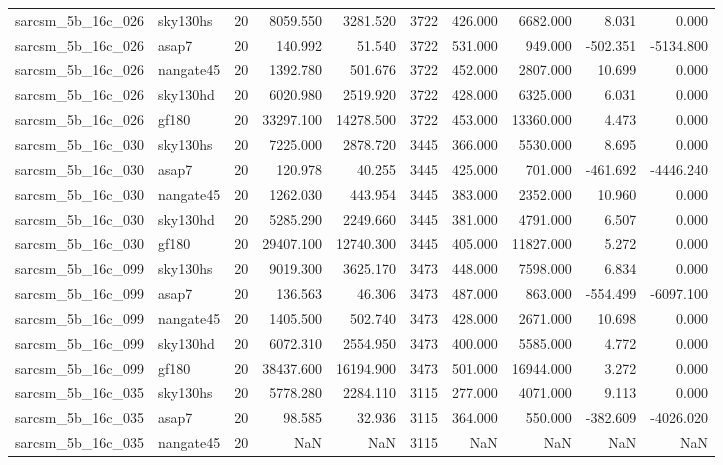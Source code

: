 \begin{longtable}{llrrrrrrrr}
sarcsm\_5b\_16c\_026 & sky130hs & 20 & 8059.550 & 3281.520 & 3722 & 426.000 & 6682.000 & 8.031 & 0.000 \\
sarcsm\_5b\_16c\_026 & asap7 & 20 & 140.992 & 51.540 & 3722 & 531.000 & 949.000 & -502.351 & -5134.800 \\
sarcsm\_5b\_16c\_026 & nangate45 & 20 & 1392.780 & 501.676 & 3722 & 452.000 & 2807.000 & 10.699 & 0.000 \\
sarcsm\_5b\_16c\_026 & sky130hd & 20 & 6020.980 & 2519.920 & 3722 & 428.000 & 6325.000 & 6.031 & 0.000 \\
sarcsm\_5b\_16c\_026 & gf180 & 20 & 33297.100 & 14278.500 & 3722 & 453.000 & 13360.000 & 4.473 & 0.000 \\
sarcsm\_5b\_16c\_030 & sky130hs & 20 & 7225.000 & 2878.720 & 3445 & 366.000 & 5530.000 & 8.695 & 0.000 \\
sarcsm\_5b\_16c\_030 & asap7 & 20 & 120.978 & 40.255 & 3445 & 425.000 & 701.000 & -461.692 & -4446.240 \\
sarcsm\_5b\_16c\_030 & nangate45 & 20 & 1262.030 & 443.954 & 3445 & 383.000 & 2352.000 & 10.960 & 0.000 \\
sarcsm\_5b\_16c\_030 & sky130hd & 20 & 5285.290 & 2249.660 & 3445 & 381.000 & 4791.000 & 6.507 & 0.000 \\
sarcsm\_5b\_16c\_030 & gf180 & 20 & 29407.100 & 12740.300 & 3445 & 405.000 & 11827.000 & 5.272 & 0.000 \\
sarcsm\_5b\_16c\_099 & sky130hs & 20 & 9019.300 & 3625.170 & 3473 & 448.000 & 7598.000 & 6.834 & 0.000 \\
sarcsm\_5b\_16c\_099 & asap7 & 20 & 136.563 & 46.306 & 3473 & 487.000 & 863.000 & -554.499 & -6097.100 \\
sarcsm\_5b\_16c\_099 & nangate45 & 20 & 1405.500 & 502.740 & 3473 & 428.000 & 2671.000 & 10.698 & 0.000 \\
sarcsm\_5b\_16c\_099 & sky130hd & 20 & 6072.310 & 2554.950 & 3473 & 400.000 & 5585.000 & 4.772 & 0.000 \\
sarcsm\_5b\_16c\_099 & gf180 & 20 & 38437.600 & 16194.900 & 3473 & 501.000 & 16944.000 & 3.272 & 0.000 \\
sarcsm\_5b\_16c\_035 & sky130hs & 20 & 5778.280 & 2284.110 & 3115 & 277.000 & 4071.000 & 9.113 & 0.000 \\
sarcsm\_5b\_16c\_035 & asap7 & 20 & 98.585 & 32.936 & 3115 & 364.000 & 550.000 & -382.609 & -4026.020 \\
sarcsm\_5b\_16c\_035 & nangate45 & 20 & NaN & NaN & 3115 & NaN & NaN & NaN & NaN \\

\end{longtable}
